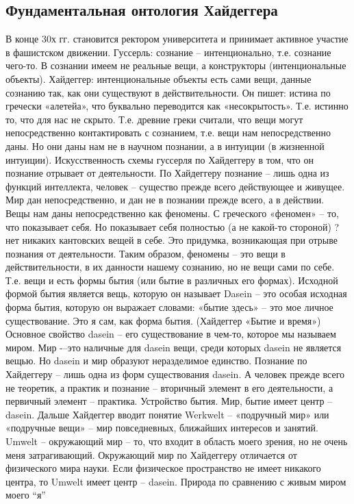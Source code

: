\documentclass[12pt]{article}
\begin{document}
\subsection{Фундаментальная онтология Хайдеггера}
В конце 30х гг. становится ректором университета и принимает активное участие в фашистском движении.
Гуссерль: сознание – интенционально, т.е. сознание чего-то. В сознании имеем не реальные вещи, а
конструкторы (интенциональные объекты).
Хайдеггер: интенциональные объекты есть сами вещи, данные сознанию так, как они существуют в
действительности.
Он пишет: истина по гречески «алетейа», что буквально переводится как «несокрытость». Т.е. истинно то, что
для нас не скрыто. Т.е. древние греки считали, что вещи могут непосредственно контактировать с сознанием,
т.е. вещи нам непосредственно даны. Но они даны нам не в научном познании, а в интуиции (в жизненной
интуиции).
Искусственность схемы гуссерля по Хайдеггеру в том, что он познание отрывает от деятельности. По
Хайдеггеру познание – лишь одна из функций интеллекта, человек – существо прежде всего действующее и
живущее. Мир дан непосредственно, и дан не в познании прежде всего, а в действии.
Вещы нам даны непосредственно как феномены. С греческого «феномен» – то, что показывает себя. Но
показывает себя полностью (а не какой-то стороной) ? нет никаких кантовских вещей в себе. Это придумка,
возникающая при отрыве познания от деятельности.
Таким образом, феномены – это вещи в действительности, в их данности нашему сознанию, но не вещи сами по
себе. Т.е. вещи и есть формы бытия (или бытие в различных его формах).
Исходной формой бытия является вещь, которую он называет Dasein – это особая исходная форма бытия,
которую он выражает словами: «бытие здесь» – это мое личное существование. Это я сам, как форма бытия.
(Хайдеггер «Бытие и время»)
Основное свойство dasein – его существование в чем-то, которое мы называем миром. Мир -–это наличные для
dasein вещи, среди которых dasein не является вещью. Но dasein и мир образуют неразделимое единство.
Познание по Хайдеггеру – лишь одна из форм существования dasein. А человек прежде всего не теоретик, а
практик и познание – вторичный элемент в его деятельности, а первичный элемент – практика.
Устройство бытия.
Мир, бытие имеет центр – dasein.
Дальше Хайдеггер вводит понятие Werkwelt – «подручный мир» или «подручные вещи» – мир повседневных,
ближайших интересов и занятий. Umwelt – окружающий мир – то, что входит в область моего зрения, но не
очень меня затрагивающий.
Окружающий мир по Хайдеггеру отличается от физического мира науки. Если физическое пространство не
имеет никакого центра, то Umwelt имеет центр – dasein. Природа по сравнению с живым миром моего “я”
\end{document}
